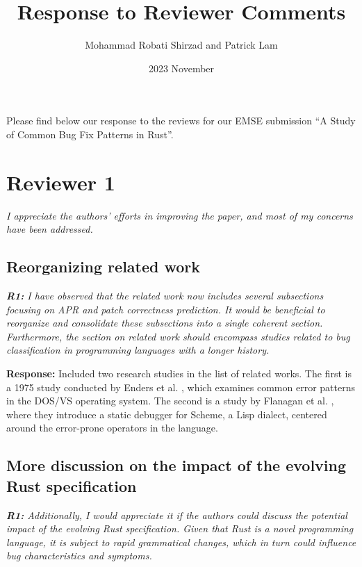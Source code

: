 \documentclass{article}
\title{Response to Reviewer Comments}
\date{2023 November}
\author{Mohammad Robati Shirzad and Patrick Lam}
\begin{document}
\maketitle

Please find below our response to the reviews for our EMSE submission ``A Study of Common Bug Fix Patterns in Rust''.

\section{Reviewer 1}

\textit{I appreciate the authors' efforts in improving the paper, and most of my concerns have been addressed.}

\subsection{Reorganizing related work}

\textit{\textbf{R1:} I have observed that the related work now includes several subsections focusing on APR and patch correctness prediction. It would be beneficial to reorganize and consolidate these subsections into a single coherent section. Furthermore, the section on related work should encompass studies related to bug classification in programming languages with a longer history.}

\vspace*{1em} \noindent \textbf{Response:} Included two research studies in the list of related works. The first is a 1975 study conducted by Enders et al. \cite{endres1975analysis}, which examines common error patterns in the DOS/VS operating system. The second is a study by Flanagan et al. \cite{flanagan1998new}, where they introduce a static debugger for Scheme, a Lisp dialect, centered around the error-prone operators in the language. 

\subsection{More discussion on the impact of the evolving Rust specification}

\textit{\textbf{R1:} Additionally, I would appreciate it if the authors could discuss the potential impact of the evolving Rust specification. Given that Rust is a novel programming language, it is subject to rapid grammatical changes, which in turn could influence bug characteristics and symptoms.}
\end{document}
